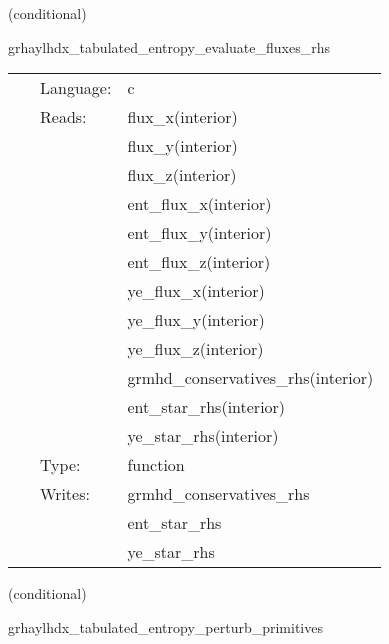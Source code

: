 \vspace{5mm}

   (conditional) 

\hspace{5mm} grhaylhdx\_tabulated\_entropy\_evaluate\_fluxes\_rhs 

\hspace{5mm}{\it entropy+tabulated version of grhaylhdx\_evaluate\_fluxes\_rhs } 


\hspace{5mm}

 \begin{tabular*}{160mm}{cll} 
~ & Language:  & c \\ 
~ & Reads:  & flux\_x(interior) \\ 
~& ~ &flux\_y(interior)\\ 
~& ~ &flux\_z(interior)\\ 
~& ~ &ent\_flux\_x(interior)\\ 
~& ~ &ent\_flux\_y(interior)\\ 
~& ~ &ent\_flux\_z(interior)\\ 
~& ~ &ye\_flux\_x(interior)\\ 
~& ~ &ye\_flux\_y(interior)\\ 
~& ~ &ye\_flux\_z(interior)\\ 
~& ~ &grmhd\_conservatives\_rhs(interior)\\ 
~& ~ &ent\_star\_rhs(interior)\\ 
~& ~ &ye\_star\_rhs(interior)\\ 
~ & Type:  & function \\ 
~ & Writes:  & grmhd\_conservatives\_rhs \\ 
~& ~ &ent\_star\_rhs\\ 
~& ~ &ye\_star\_rhs\\ 
\end{tabular*} 


\vspace{5mm}

   (conditional) 

\hspace{5mm} grhaylhdx\_tabulated\_entropy\_perturb\_primitives 

\hspace{5mm}{\it entropy+tabulated version of grhaylhdx\_perturb\_primitives } 


\hspace{5mm}

